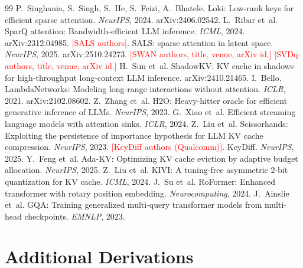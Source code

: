 \documentclass[10pt]{article}
\newcommand{\TODO}[1]{\textcolor{red}{[#1]}}
\theoremstyle{plain}
\theoremstyle{definition}
\theoremstyle{remark}
\begin{document}

\begin{thebibliography}{99}
 P.~Singhania, S.~Singh, S.~He, S.~Feizi, A.~Bhatele. Loki: Low-rank keys for efficient sparse attention. \emph{NeurIPS}, 2024. arXiv:2406.02542.
 L.~Ribar et~al. SparQ attention: Bandwidth-efficient LLM inference. \emph{ICML}, 2024. arXiv:2312.04985.
 \TODO{SALS authors}. SALS: sparse attention in latent space. \emph{NeurIPS}, 2025. arXiv:2510.24273.
 \TODO{SWAN authors, title, venue, arXiv id.}
 \TODO{SVDq authors, title, venue, arXiv id.}
 H.~Sun et~al. ShadowKV: KV cache in shadows for high-throughput long-context LLM inference. arXiv:2410.21465.
 I.~Bello. LambdaNetworks: Modeling long-range interactions without attention. \emph{ICLR}, 2021. arXiv:2102.08602.
 Z.~Zhang et~al. H2O: Heavy-hitter oracle for efficient generative inference of LLMs. \emph{NeurIPS}, 2023.
 G.~Xiao et~al. Efficient streaming language models with attention sinks. \emph{ICLR}, 2024.
 Z.~Liu et~al. Scissorhands: Exploiting the persistence of importance hypothesis for LLM KV cache compression. \emph{NeurIPS}, 2023.
 \TODO{KeyDiff authors (Qualcomm)}. KeyDiff. \emph{NeurIPS}, 2025.
 Y.~Feng et~al. Ada-KV: Optimizing KV cache eviction by adaptive budget allocation. \emph{NeurIPS}, 2025.
 Z.~Liu et~al. KIVI: A tuning-free asymmetric 2-bit quantization for KV cache. \emph{ICML}, 2024.
 J.~Su et~al. RoFormer: Enhanced transformer with rotary position embedding. \emph{Neurocomputing}, 2024.
 J.~Ainslie et~al. GQA: Training generalized multi-query transformer models from multi-head checkpoints. \emph{EMNLP}, 2023.
\end{thebibliography}

\appendix

\section{Additional Derivations}
\label{app:derivations}
\end{document}
